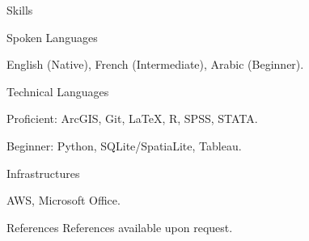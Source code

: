 \documentclass[10pt]{resume} %
\begin{document}
	\begin{rSection}{Skills} \itemsep -5pt
		\begin{rSubsection}{Spoken Languages}{}{}
			\item English (Native), French (Intermediate), Arabic (Beginner).
		\end{rSubsection}
		\begin{rSubsection}{Technical Languages}{}{}
			\item Proficient: ArcGIS, Git, \LaTeX, R, SPSS, STATA.
			\item Beginner: Python, SQLite/SpatiaLite, Tableau.
		\end{rSubsection}
		\begin{rSubsection}{Infrastructures}{}{}
			\item AWS, Microsoft Office.
		\end{rSubsection}
	\end{rSection}
	
	\begin{rSection}{References}
		References available upon request. 
	\end{rSection}
	
\end{document}
